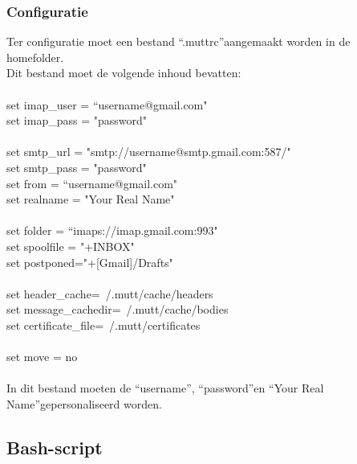 \documentclass[12pt]{article}
\begin{document}
				\subsubsection{Configuratie}
					Ter configuratie moet een bestand \textquotedblleft .muttrc\textquotedblright aangemaakt worden in de homefolder.\\
					Dit bestand moet de volgende inhoud bevatten:\\
						\\
						set imap\_user = \textquotedblleft username@gmail.com"\\
						set imap\_pass = "password"\\
						\\
						set smtp\_url = "smtp://username@smtp.gmail.com:587/"\\
						set smtp\_pass = "password"\\
						set from = \textquotedblleft username@gmail.com"\\
						set realname = "Your Real Name"\\
						\\
						set folder = \textquotedblleft imaps://imap.gmail.com:993"\\
						set spoolfile = "+INBOX"\\
						set postponed="+[Gmail]/Drafts"\\
						\\
						set header\_cache=~/.mutt/cache/headers\\
						set message\_cachedir=~/.mutt/cache/bodies\\
						set certificate\_file=~/.mutt/certificates\\
						\\
						set move = no\\
						\\
					In dit bestand moeten de \textquotedblleft username\textquotedblright, \textquotedblleft password\textquotedblright en \textquotedblleft Your Real Name\textquotedblright 								gepersonaliseerd worden.\\
			\cite{Mail}
					
			\subsection{Bash-script}\label{Script}
				
\end{document}
